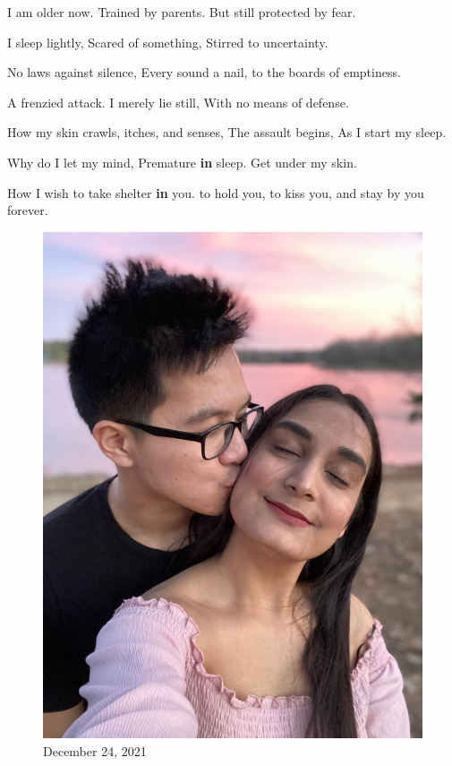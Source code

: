\documentclass[
]{book}
\newenvironment{Shaded}{\begin{snugshade}}{\end{snugshade}}
\newcommand{\ControlFlowTok}[1]{\textcolor[rgb]{0.13,0.29,0.53}{\textbf{#1}}}
\newcommand{\NormalTok}[1]{#1}
\begin{document}
\begin{Shaded}
\begin{Highlighting}[]
\NormalTok{I am older now.}
\NormalTok{Trained by parents.}
\NormalTok{But still protected by fear.}

\NormalTok{I sleep lightly,}
\NormalTok{Scared of something,}
\NormalTok{Stirred to uncertainty.}

\NormalTok{No laws against silence,}
\NormalTok{Every sound a nail,}
\NormalTok{to the boards of emptiness.}

\NormalTok{A frenzied attack.}
\NormalTok{I merely lie still,}
\NormalTok{With no means of defense.}

\NormalTok{How my skin crawls, itches, and senses,}
\NormalTok{The assault begins,}
\NormalTok{As I start my sleep.}

\NormalTok{Why do I let my mind,}
\NormalTok{Premature }\ControlFlowTok{in}\NormalTok{ sleep.}
\NormalTok{Get under my skin.}

\NormalTok{How I wish to take shelter }\ControlFlowTok{in}\NormalTok{ you.}
\NormalTok{to hold you, to kiss you,}
\NormalTok{and stay by you forever.}
\end{Highlighting}
\end{Shaded}

\begin{figure}
\centering
\includegraphics[width=5.20833in,height=\textheight]{mimages/14.1 12-24-2021.jpg}
\caption{December 24, 2021}
\end{figure}
\end{document}
